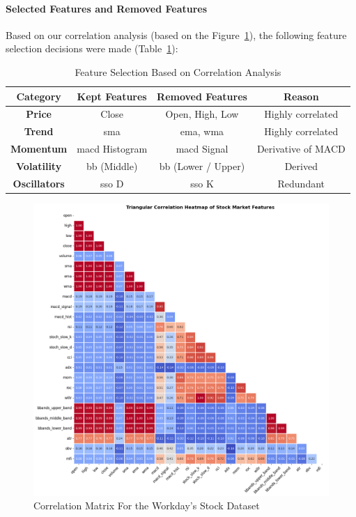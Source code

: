 \paragraph{Selected Features and Removed Features}
Based on our correlation analysis (based on the Figure~\ref{fig:app-correlation}), the 
following feature selection decisions were made (Table~\ref{tab:feature_selection}):

\begin{table}[H]
    \centering
    \caption{Feature Selection Based on Correlation Analysis}
    \label{tab:feature_selection}
    \begin{tabular}{cccc}
        \hline
        \textbf{Category} & \textbf{Kept Features} & \textbf{Removed Features} & \textbf{Reason} \\
        \hline\hline
        \textbf{Price} & Close & Open, High, Low & Highly correlated \\
        \textbf{Trend} & \acrshort{sma} & \acrshort{ema}, \acrshort{wma} & Highly correlated \\
        \textbf{Momentum} & \acrshort{macd} Histogram & \acrshort{macd} Signal & Derivative of MACD \\
        \textbf{Volatility} & \acrshort{bb} (Middle) & \acrshort{bb} (Lower / Upper) & Derived \\
        \textbf{Oscillators} & \acrshort{sso} D & \acrshort{sso} K & Redundant \\
        \hline
    \end{tabular}
\end{table}

\begin{figure}[H]%
    \centering
    \caption{Correlation Matrix For the Workday's Stock Dataset}
    \label{fig:app-correlation}
    \includegraphics[width=\linewidth]{img/sections/main/correlation.png}
\end{figure}

